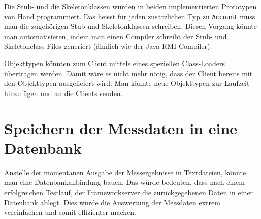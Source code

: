 Die Stub- und die Skeletonklassen wurden in beiden implementierten Prototypen von Hand programmiert. Das heisst für jeden zusätzlichen Typ zu \texttt{Account} muss man die zugehörigen Stub und Skeletonklassen schreiben. Diesen Vorgang könnte man automatisieren, indem man einen Compiler schreibt der Stub- und Skeletonclass-Files generiert (ähnlich wie der Java RMI Compiler).

Objekttypen könnten zum Client mittels eines speziellen Class-Loaders übertragen werden. Damit wäre es nicht mehr nötig, dass der Client bereits mit den Objekttypen ausgeliefert wird. Man könnte neue Objekttypen zur Laufzeit hinzufügen und an die Clients senden.

\section{Speichern der Messdaten in eine Datenbank}
\label{sec:DBspeichern}
Anstelle der momentanen Ausgabe der Messergebnisse in Textdateien, könnte man eine Datenbankanbindung bauen. Das würde bedeuten, dass nach einem erfolgreichen Testlauf, der Frameworkserver die zurückgegebenen Daten in einer Datenbank ablegt. Dies würde die Auswertung der Messdaten extrem vereinfachen und somit effizienter machen.


